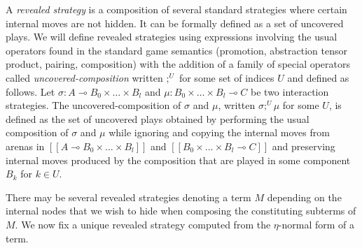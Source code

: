 \documentclass{llncs}
\newcommand{\lsem}{[\![} %
\newcommand{\rsem}{]\!]} %
\newcommand{\sem}[1]{{\lsem #1 \rsem}}
\begin{document}
A \emph{revealed strategy} is a composition of several standard strategies where
certain internal moves are not hidden. It can be formally defined as a set
of uncovered plays. We will define revealed strategies using expressions involving the usual operators found in the standard game semantics (promotion, abstraction tensor product, pairing, composition) with the addition of a family of special operators called \emph{uncovered-composition} written
$;^U$ for some set of indices $U$ and defined as follows.
Let $\sigma : A \multimap B_0 \times \ldots \times B_l$ and $\mu : B_0 \times
\ldots \times B_l \multimap C$ be two interaction strategies.
The uncovered-composition of $\sigma$ and $\mu$, written $\sigma ;^U \mu$ for some $U$, is defined as
the set of uncovered plays obtained by performing the usual composition of $\sigma$ and $\mu$
while ignoring and copying the internal moves from arenas in
$\sem{A \multimap B_0 \times \ldots \times B_l}$ and $\sem{B_0 \times
\ldots \times B_l \multimap C}$ and preserving internal
moves produced by the composition that are played in some component $B_k$ for $k \in U$.

There may be several revealed strategies denoting a term $M$ depending on the internal nodes that we wish to hide when
composing the constituting subterms of $M$. We now fix a unique revealed strategy computed from the $\eta$-normal
form of a term.
\end{document}
